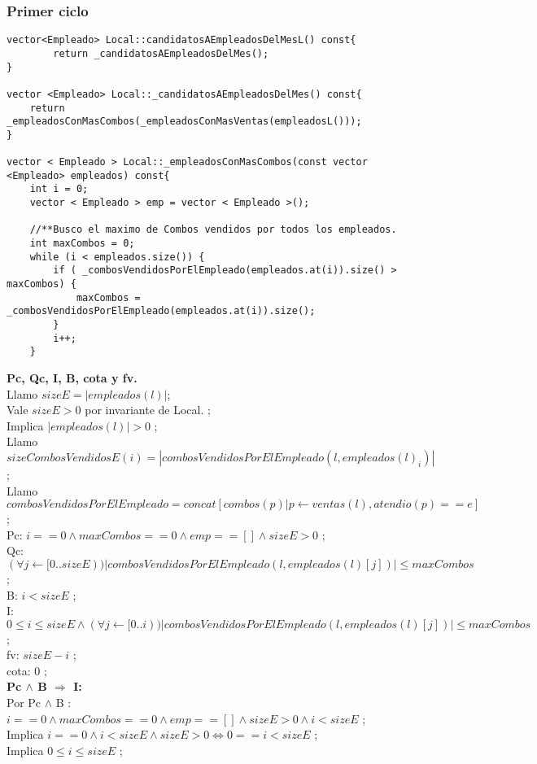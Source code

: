 \subsubsection{Primer ciclo}
\begin{lstlisting}
vector<Empleado> Local::candidatosAEmpleadosDelMesL() const{
        return _candidatosAEmpleadosDelMes();
}

vector <Empleado> Local::_candidatosAEmpleadosDelMes() const{
	return _empleadosConMasCombos(_empleadosConMasVentas(empleadosL()));
}

vector < Empleado > Local::_empleadosConMasCombos(const vector <Empleado> empleados) const{
	int i = 0;
	vector < Empleado > emp = vector < Empleado >();

	//**Busco el maximo de Combos vendidos por todos los empleados.
	int maxCombos = 0;
	while (i < empleados.size()) {
		if ( _combosVendidosPorElEmpleado(empleados.at(i)).size() > maxCombos) {
			maxCombos = _combosVendidosPorElEmpleado(empleados.at(i)).size();
		}
		i++;
	}
\end{lstlisting} 


\hspace{15pt}\textbf{Pc, Qc, I, B, cota y fv.} \\
Llamo $sizeE = |empleados(l)| $; \\
Vale $sizeE > 0$ por invariante de Local. ;\\
Implica  $|empleados(l)| > 0$ ;\\
Llamo $sizeCombosVendidosE(i) = | combosVendidosPorElEmpleado(l, empleados(l)_i) | $; \\
Llamo $combosVendidosPorElEmpleado = concat[combos(p)|p \leftarrow ventas(l), atendio(p) == e]$ ;\\

Pc: $i == 0 \wedge maxCombos == 0 \wedge emp == [] \wedge sizeE > 0$ ;\\
Qc: $(\forall j \leftarrow [0..sizeE)) |combosVendidosPorElEmpleado(l, empleados(l)[j])| \leq maxCombos$ ;\\
B: $i < sizeE$ ;\\
I: $0 \leq i \leq sizeE \wedge (\forall j \leftarrow [0..i)) |combosVendidosPorElEmpleado(l, empleados(l)[j])| \leq maxCombos$ ;\\ 	
fv: $sizeE - i$ ;\\
cota: 0 ;\\

\hspace{15pt}\textbf{Pc $\wedge$ B $\Rightarrow$ I:} \\
Por Pc $\wedge$ B : $i == 0 \wedge maxCombos == 0 \wedge emp == [] \wedge sizeE > 0 \wedge i < sizeE $ ;\\
Implica $ i == 0 \wedge i < sizeE \wedge sizeE > 0 \Leftrightarrow 0 == i < sizeE $ ; \\
Implica $ 0 \leq i \leq sizeE $ ;\\

